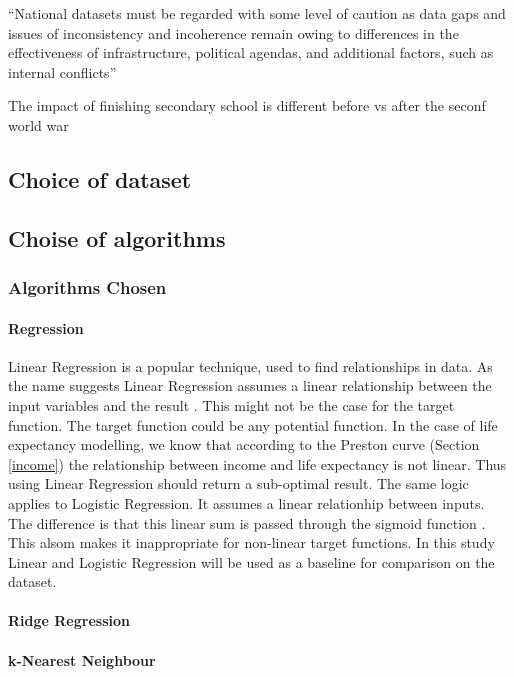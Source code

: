 \documentclass[12pt,a4paper]{article}
\begin{document}
``National datasets must be regarded with some level of caution as data gaps and issues of inconsistency and incoherence remain owing to differences in the effectiveness of infrastructure, political agendas, and additional factors, such as internal conflicts'' \cite{Bulled2010}  


The impact of finishing secondary school is different before vs after the seconf world war \cite{Deboosere2009}

\subsection{Choice of dataset}


\subsection{Choise of algorithms}

\subsubsection{Algorithms Chosen}
\paragraph{Regression}
Linear Regression is a popular technique, used to find relationships in data. As the name suggests Linear Regression assumes a linear relationship between the input variables and the result \citep{Murphy}. This might not be the case for the target function. The target function could be any potential function. In the case of life expectancy modelling, we know that according to the Preston curve (Section \ref{income}) the relationship between income and life expectancy is not linear. Thus using Linear Regression should return a sub-optimal result. The same logic applies to Logistic Regression. It assumes a linear relationhip between inputs. The difference is that this linear sum is passed through the sigmoid function \citep{Murphy}. This alsom makes it inappropriate for non-linear target functions. In this study Linear and Logistic Regression will be used as a baseline for comparison on the dataset.

\paragraph{Ridge Regression}

\paragraph{k-Nearest Neighbour}
\end{document}
